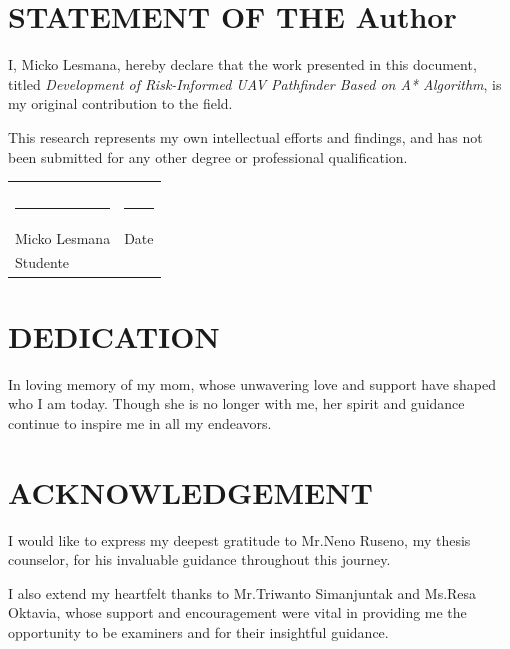 \documentclass[12pt]{report}
\begin{document}
    \chapter*{STATEMENT OF THE Author}
    I, Micko Lesmana, hereby declare that the work presented in this document, titled \textit{Development of Risk-Informed
    UAV Pathfinder Based on A* Algorithm}, is my original contribution to the field. 

    This research represents my own intellectual efforts and findings, and has not been submitted for any other degree
    or professional qualification. 

    \vspace{2cm}

            \begin{tabular}{@{}p{4in}p{2in}@{}}
                                                & \\
                                                & \\
            \rule{5cm}{0.5pt}                   & \rule{5cm}{0.5pt}\\
            Micko Lesmana                       & Date \\
            Studente                            & \\
            \end{tabular}


    \chapter*{DEDICATION}
    
    In loving memory of my mom, whose unwavering love and support have shaped who I am today. Though she is no longer
    with me, her spirit and guidance continue to inspire me in all my endeavors.


    \chapter*{ACKNOWLEDGEMENT}
    I would like to express my deepest gratitude to Mr.Neno Ruseno, my thesis counselor, for his invaluable guidance
    throughout this journey. 

    I also extend my heartfelt thanks to Mr.Triwanto Simanjuntak and Ms.Resa Oktavia, whose support and encouragement were
    vital in providing me the opportunity to be examiners and for their insightful guidance.
\end{document}
